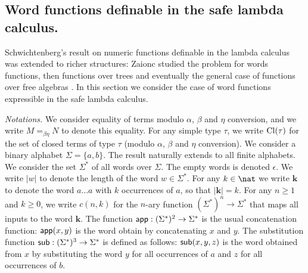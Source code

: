 \newcommand{\openedof}[2]{{\rm Op}(#1,#2)} %

\newcommand\wordnum[1]{\mathbf{#1}} %
\newcommand\safedefset{$\lambda^{safe}${\rm def}}

\newcommand\fatlambda{\lambda\kern-0.7em\lambda}
\newcommand\wordapp{{\sf app}}
\newcommand\wordsub{{\sf sub}}


\subsection{Word functions definable in the safe lambda calculus.}
Schwichtenberg's result on numeric functions definable in the lambda
calculus was extended to richer structures: Zaionc studied the
problem for words functions, then functions over trees and
eventually the general case of functions over free algebras
\cite{DBLP:journals/tcs/Leivant93,DBLP:journals/apal/Zaionc91,702481,DBLP:journals/tcs/Zaionc87,
zaionc:csl94}. In this section we consider the case of word
functions expressible in the safe lambda calculus.
\smallskip

\emph{Notations.} We consider equality of terms modulo $\alpha$,
$\beta$ and $\eta$ conversion, and we write $M=_{\beta\eta} N$ to
denote this equality. For any simple type $\tau$, we write
${\rm Cl}(\tau)$ for the set of closed terms of type $\tau$ (modulo
$\alpha$, $\beta$ and $\eta$ conversion). We consider a binary
alphabet $\Sigma = \{a,b\}$. The result naturally extends to all
finite alphabets. We consider the set $\Sigma^*$ of all words over
$\Sigma$. The empty words is denoted $\epsilon$. We write $|w|$ to
denote the length of the word $w\in\Sigma^*$. For any $k\in \nat$ we
write $\wordnum{k}$ to denote the word $a \ldots a$ with $k$
occurrences of $a$, so that $|\wordnum{k}| = k$. For any $n\geq 1$
and $k\geq 0$, we write $c(n,k)$ for the $n$-ary function
$(\Sigma^*)^n \rightarrow \Sigma^*$ that maps all inputs to the word
$\wordnum{k}$. The function $\wordapp : (\Sigma^*)^2 \rightarrow
\Sigma^*$ is the usual concatenation function: $\wordapp(x,y)$ is
the word obtain by concatenating $x$ and $y$. The substitution
function $\wordsub : (\Sigma^*)^3 \rightarrow \Sigma^*$ is defined
as follows: $\wordsub(x,y,z)$ is the word obtained from $x$ by
substituting the word $y$ for all occurrences of $a$ and $z$ for all
occurrences of $b$.

